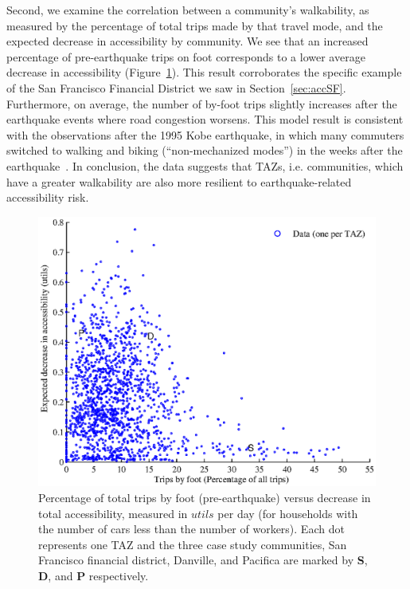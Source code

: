 
Second, we examine the correlation between a community's walkability, as measured by the percentage of total trips made by that travel mode, and the expected decrease in accessibility by community. We see that an increased percentage of pre-earthquake trips on foot corresponds to a lower average decrease in accessibility (Figure~\ref{fig:walkingVsAcc}). This result corroborates the specific example of the San Francisco Financial District we saw in Section~\ref{sec:accSF}. Furthermore,  on average, the number of by-foot trips slightly increases after the earthquake events where road congestion worsens. This model result is consistent with the observations after the 1995 Kobe earthquake, in which many commuters switched to walking and biking (``non-mechanized modes'') in the weeks after the earthquake~\cite{gordon_transport-related_1998}. In conclusion, the data suggests that TAZs, i.e. communities, which have a greater walkability are also more resilient to earthquake-related accessibility risk. 

\begin{figure}
\centering
\includegraphics[width=6in]{FIGS/equity_footVsAcc2.eps} 
\caption{Percentage of total trips by foot (pre-earthquake) versus decrease in total accessibility, measured in $utils$ per day (for households with the number of cars less than the number of workers). Each dot represents one TAZ and the three case study communities, San Francisco financial district, Danville, and Pacifica are marked by \textbf{S}, \textbf{D}, and \textbf{P} respectively. }
\label{fig:walkingVsAcc}
\end{figure}


